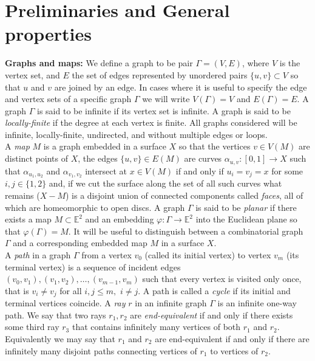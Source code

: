 \documentclass{article}
\numberwithin{equation}{section}
\newcommand{\EE}{\mathbb{E}}
\theoremstyle{definition}
\theoremstyle{remark}
\begin{document}

 
\section{Preliminaries and General properties}\label{sec:Prelim_Gen}
\textbf{Graphs and maps:} We define a graph to be pair $\Gamma=(V,E)$, where $V$ is the vertex set, and $E$ the set of edges represented by unordered pairs $\{u,v\}\subset V$ so that $u$ and $v$ are joined by an edge. In cases where it is useful to specify the edge and vertex sets of a specific graph $\Gamma$ we will write $V(\Gamma)=V$ and $E(\Gamma)=E$. A graph $\Gamma$ is said to be infinite if its vertex set is infinite. A graph is said to be \textit{locally-finite} if the degree at each vertex is finite.
All graphs considered will be infinite, locally-finite, undirected, and without multiple edges or loops.\\
A \textit{map} $M$ is a graph embedded in a surface $X$ so that the vertices $v\in V(M)$ are distinct points of $X$, the edges $\{u,v\}\in E(M)$ are curves $\alpha_{u,v}:[0,1]\rightarrow X$ such that $\alpha_{u_1,u_2}$ and $\alpha_{v_1,v_2}$ intersect at $x\in V(M)$ if and only if $u_i=v_j=x$ for some $i,j\in\{1,2\}$ and, if we cut the surface along the set of all such curves what remains ($X-M$) is a disjoint union of connected components called \textit{faces}, all of which are homeomorphic to open discs.
A graph $\Gamma$ is said to be \textit{planar} if there exists a map $M\subset \EE^2$ and an embedding $\varphi:\Gamma\rightarrow \EE^2$ into the Euclidean plane so that $\varphi(\Gamma)=M$.
It will be useful to distinguish between a combinatorial graph $\Gamma$ and a corresponding embedded map $M$ in a surface $X$.\\
A \textit{path} in a graph $\Gamma$ from a vertex $v_0$ (called its initial vertex) to vertex $v_m$ (its terminal vertex) is a sequence of incident edges $(v_0,v_1),(v_1,v_2),\ldots,(v_{m-1},v_m)$ such that every vertex is visited only once, that is $v_i\neq v_j$ for all $i,j\leq m,$ $i\neq j$.
A path is called a \textit{cycle} if its initial and terminal vertices coincide.
A \textit{ray} $r$ in an infinite graph $\Gamma$ is an infinite one-way path. We say that two rays $r_1,r_2$ are \textit{end-equivalent} if and only if there exists some third ray $r_3$ that contains infinitely many vertices of both $r_1$ and $r_2$. Equivalently we may say that $r_1$ and $r_2$ are end-equivalent if and only if there are infinitely many disjoint paths connecting vertices of $r_1$ to vertices of $r_2$. 
\end{document}
